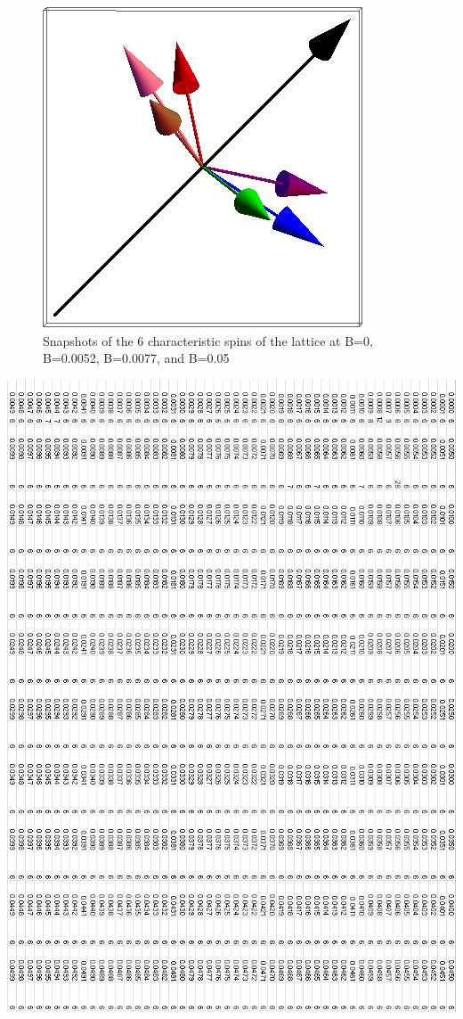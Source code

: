 \documentclass{article}
\begin{document}
\begin{figure}[ht]
\includegraphics[scale=0.27]{111_2000/4S000to005G.png}
\caption{Snapshots of the 6 characteristic spins of the lattice at B=0, B=0.0052, B=0.0077, and B=0.05}
\end{figure}
\clearpage

\begin{center}
 \includegraphics[keepaspectratio,scale=0.58]{111_2000/000to005SpinChart.png}
\end{center}
\clearpage
\end{document}
